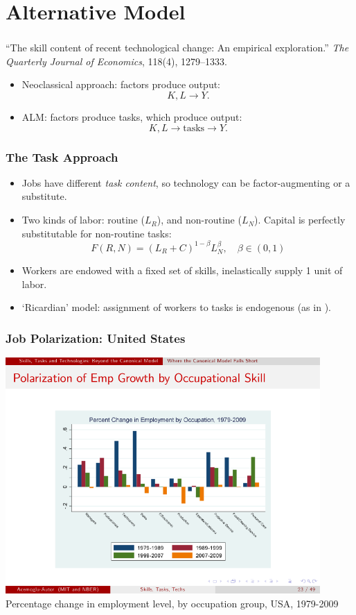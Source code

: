 \documentclass[red]{beamer}
\begin{document}
\section{Alternative Model}
\begin{frame}[fragile] %
\frametitle{\cite{Levy2003}}
``The skill content of recent technological change: An empirical exploration.'' \emph{The Quarterly Journal of Economics}, 118(4), 1279--1333.
\vspace{1cm}

\begin{itemize}
\item Neoclassical approach: factors produce output:
\[ K,L \rightarrow Y. \]
\item ALM: factors produce tasks, which produce output:
\[ K, L \rightarrow \text{tasks} \rightarrow Y. \]
\end{itemize}
\end{frame}

\begin{frame}
\frametitle{The Task Approach}
\begin{itemize}
\item Jobs have different \emph{task content}, so technology can be factor-augmenting or a substitute.
\item Two kinds of labor: routine ($L_R$), and non-routine ($L_N$). Capital is perfectly substitutable for non-routine tasks:
$$ F(R,N) = (L_R + C)^{1-\beta}L_N^{\beta},\quad\beta\in(0,1)$$
\item Workers are endowed with a fixed set of skills, inelastically supply 1 unit of labor.
\item `Ricardian' model: assignment of workers to tasks is endogenous (as in \cite{Roy1951}).
\end{itemize}
\end{frame}

\begin{frame}
  \frametitle{Job Polarization: United States}
  \begin{center}
  \includegraphics[width=0.9\textwidth]{slides/level_by_occ.pdf} \\
  Percentage change in employment level, by occupation group, USA, 1979-2009 \citep{Acemoglu2011}
  \end{center}
\end{frame}
\end{document}
